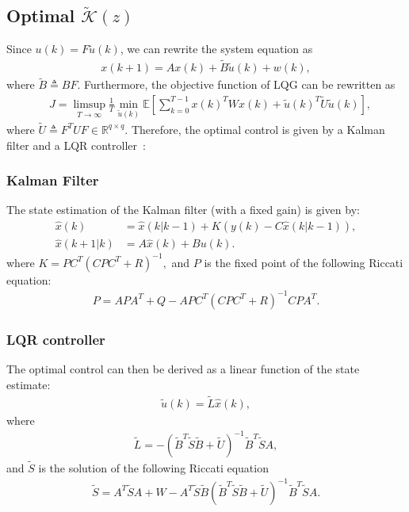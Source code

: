 
  \subsection{Optimal $\tilde {\mathcal K}(z)$}

  Since $u(k) = F \tilde u(k)$, we can rewrite the system equation as
  \begin{align*}
    x(k+1) = A x(k) + \tilde B\tilde u(k) + w(k),
  \end{align*}
  where $\tilde B\triangleq BF$. Furthermore, the objective function of LQG can be rewritten as
  \begin{align*}
    &J = \limsup_{T\rightarrow \infty}\frac{1}{T}\min_{\tilde u(k)}\mathbb{E}\left[\sum_{k=0}^{T-1} x(k)^TWx(k)+\tilde u(k)^T\tilde U\tilde u(k)\right],
  \end{align*}
  where $\tilde U \triangleq F^TUF\in \mathbb R^{q\times q}$. Therefore, the optimal control is given by a Kalman filter and a LQR controller~\cite{Schenato_2007}:
  \subsubsection*{Kalman Filter}
  The state estimation of the Kalman filter (with a fixed gain) is given by:
  \begin{align*}
    \hat x(k)& = \hat x(k|k - 1)  + K (y(k)  - C \hat x (k|k - 1) ) ,\\
    \hat x (k + 1|k) & = A \hat x(k) +Bu(k).
  \end{align*}
  where
$    K= P C^T (CP C^T  + R)^{ - 1}, $
  and $P$ is the fixed point of the following Riccati equation:
  \begin{align*}
    P = APA^T+Q - APC^T(CPC^T+R)^{-1}CPA^T.
  \end{align*}
  \subsubsection*{LQR controller}
  The optimal control can then be derived as a linear function of the state estimate:
  \begin{align}
    \tilde u(k) = \tilde L \hat x(k),
  \end{align}
  where
  \begin{align*}
    \tilde L = -(\tilde B^T\tilde S \tilde B + \tilde U)^{-1}\tilde B^T\tilde S A,
  \end{align*}
  and $\tilde S$ is the solution of the following Riccati equation
  \begin{align}
    \tilde S =  A^T \tilde SA+W - A^T\tilde S\tilde B(\tilde B^T\tilde S\tilde B+\tilde U)^{-1}\tilde B^T \tilde SA.
    \label{eq:tildeS}
  \end{align}

